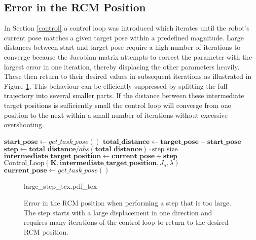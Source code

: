 \subsection{Error in the RCM Position}

In Section \ref{control} a control loop was introduced which iterates until the robot's current pose matches a given target pose within a predefined magnitude. Large distances between start and target pose require a high number of iterations to converge because the Jacobian matrix attempts to correct the parameter with the largest error in one iteration, thereby displacing the other parameters heavily. These then return to their desired values in subsequent iterations as illustrated in Figure \ref{large_step}. This behaviour can be efficiently suppressed by splitting the full trajectory into several smaller parts. If the distance between these intermediate target positions is sufficiently small the control loop will converge from one position to the next within a small number of iterations without excessive overshooting.

\begin{algorithm}[t!]
 \begin{algorithmic}[1]
  \STATE $\textbf{start\_pose} \leftarrow \textit{get\_task\_pose}()$
  \STATE $\textbf{total\_distance} \leftarrow \textbf{target\_pose} - \textbf{start\_pose}$
  \STATE $\textbf{step} \leftarrow \textbf{total\_distance} / abs(\textbf{total\_distance}) \cdot \text{step\_size}$
   \STATE $\textbf{intermediate\_target\_position} \leftarrow \textbf{current\_pose} + \textbf{step}$
   \STATE $\text{Control\_Loop}(\bm{K}, \textbf{intermediate\_target\_position}, J_a, \lambda)$
   \STATE $\textbf{current\_pose} \leftarrow \textit{get\_task\_pose}()$
   \ENDWHILE 
 \end{algorithmic}
 \caption{$\text{Extended\_Control\_Loop}(\textbf{target\_pose}, \text{step\_size})$}
 \label{alg:ext_control_loop}
\end{algorithm}

\begin{figure}[b!]
	\begin{center}
		{large_step_tex.pdf_tex}
		\caption{Error in the RCM position when performing a step that is too large. The step starts with a large displacement in one direction and requires many iterations of the control loop to return to the desired RCM position.}
		\label{large_step}
	\end{center}
\end{figure}

